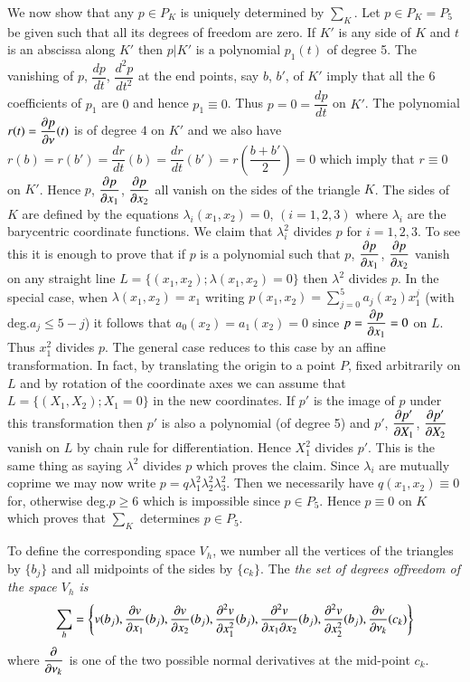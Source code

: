 \begin{example}
We now show that any $p\in P_{K}$ is uniquely determined by
$\sum_{K}$. Let $p\in P_{K}=P_{5}$ be given such that all its degrees
of freedom are zero. If $K'$ is any side of $K$ and $t$ is an abscissa
along $K'$ then $p|K'$ is a polynomial $p_{1}(t)$ of degree 5. The
vanishing of $p$, $\dfrac{dp}{dt}$, $\dfrac{d^{2}p}{dt^{2}}$ at the
end points, say $b$, $b'$, of $K'$ imply that all the 6 coefficients
of $p_{1}$ are $0$ and hence $p_{1}\equiv 0$. Thus
$p=0=\dfrac{dp}{dt}$ on $K'$. The polynomial $r(t)=\dfrac{\partial p}{\partial
  \nu}(t)$ is of degree $4$ on $K'$ and we also have
$r(b)=r(b')=\dfrac{dr}{dt}(b)=\dfrac{dr}{dt}(b')=r\left(\dfrac{b+b'}{2}\right)=0$
which imply that $r\equiv 0$ on $K'$. Hence $p$, $\dfrac{\partial p}{\partial
  x_{1}}$, $\dfrac{\partial p}{\partial x_{2}}$ all vanish on the sides of the
triangle $K$. The sides of $K$ are defined by the equations
$\lambda_{i}(x_{1},x_{2})=0$, $(i=1,2,3)$ where $\lambda_{i}$ are the
barycentric coordinate functions. We claim that $\lambda^{2}_{i}$
divides $p$ for $i=1,2,3$. To see this it is enough to prove that if
$p$ is a polynomial such that $p$, $\dfrac{\partial p}{\partial x_{1}}$,
$\dfrac{\partial p}{\partial x_{2}}$ vanish on any straight line
$L=\{(x_{1},x_{2});\lambda(x_{1},x_{2})=0\}$ then $\lambda^{2}$
divides $p$. In the special case, when $\lambda(x_{1},x_{2})=x_{1}$
writing $p(x_{1},x_{2})=\sum^{5}_{j=0}a_{j}(x_{2})x^{j}_{1}$ (with
deg.\@ $a_{j}\leq 5-j$) it follows that $a_{0}(x_{2})=a_{1}(x_{2})=0$
since $p=\dfrac{\partial p}{\partial x_{1}}=0$ on $L$. Thus $x^{2}_{1}$ divides
$p$. The general case reduces to this case by an affine
transformation. In fact, by translating the origin to a point $P$,
fixed arbitrarily on $L$ and by rotation of the coordinate axes we can
assume that $L=\{(X_{1},X_{2});X_{1}=0\}$ in the new coordinates. If
$p'$ is the image of $p$ under this transformation then $p'$ is also a
polynomial (of degree 5) and $p'$, $\dfrac{\partial p'}{\partial X_{1}}$,
$\dfrac{\partial p'}{\partial X_{2}}$ vanish on $L$ by chain rule for
differentiation. Hence $X^{2}_{1}$ divides $p'$. This is the same
thing as saying $\lambda^{2}$ divides $p$ which proves the
claim. Since $\lambda_{i}$ are mutually coprime we may now write
$p=q\lambda^{2}_{1}\lambda^{2}_{2}\lambda^{2}_{3}$. Then we
necessarily have $q(x_{1},x_{2})\equiv 0$ for, otherwise deg.\@ $p\geq
6$ which is impossible since $p\in P_{5}$. Hence $p\equiv 0$ on $K$
which proves that $\sum_{K}$ determines $p\in P_{5}$.

To define the corresponding space $V_{h}$, we number all the vertices
of the triangles by $\{b_{j}\}$ and all midpoints of the sides by
$\{c_{k}\}$. The {\em the set of degrees of\pageoriginale freedom of
  the space $V_{h}$ is}
$$
\sum_{h}=\left\{v(b_{j}),\frac{\partial v}{\partial x_{1}}(b_{j}),\frac{\partial v}{\partial
  x_{2}}(b_{j}),\frac{\partial^{2}v}{\partial x^{2}_{1}}(b_{j}),\frac{\partial^{2}v}{\partial
  x_{1}\partial x_{2}}(b_{j}),\frac{\partial^{2}v}{\partial x^{2}_{2}}(b_{j}),\frac{\partial
  v}{\partial \nu_{k}}(c_{k})\right\} 
$$  
where $\dfrac{\partial}{\partial\nu_{k}}$ is one of the two possible normal
derivatives at the mid-point $c_{k}$.


\end{example}

